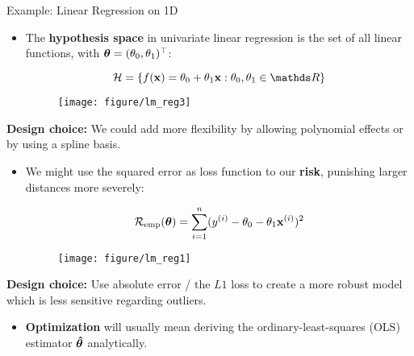 \documentclass[11pt,compress,t,notes=noshow, xcolor=table]{beamer}
\begin{document}
\begin{vbframe}{Example: Linear Regression on 1D}
  
  
  \begin{itemize}
    
    \item The \textbf{hypothesis space} in univariate linear regression is the set 
    of all linear functions, with $\bm{\theta} = (\theta_0, \theta_1)^\top$:
    
    $$\Hspace = \{\fx = \theta_0 + \theta_1 \xv: \theta_0, \theta_1 \in \R \}$$
    
    \begin{figure}
      \texttt{[image: figure/lm\_reg3]} 
    \end{figure}
  \end{itemize}
  
  \vfill
  
  \textbf{Design choice:} We could add more flexibility by allowing polynomial effects or by using a spline basis.
  
  \framebreak

  \begin{itemize}  
    \item We might use the squared error as loss function to our
    \textbf{risk}, punishing larger distances %
    more severely:
    
    $$\mathcal{R}_{\text{emp}}(\bm{\theta}) = \sum\limits_{i=1}^n (y^{(i)} - \theta_0 - \theta_1 \mathbf{x}^{(i)})^2$$
    
    \begin{figure}
      \texttt{[image: figure/lm\_reg1]} 
    \end{figure}

  \end{itemize}

  \vfill

  \textbf{Design choice:} Use absolute error / the $L1$ loss to create a more robust model which is less sensitive regarding outliers.
  
  \framebreak
  \begin{itemize}  
    \item \textbf{Optimization} will usually mean deriving the 
    ordinary-least-squares (OLS) estimator $\bm{\hat\theta}$ analytically.
  \end{itemize}


\end{vbframe}
\end{document}
